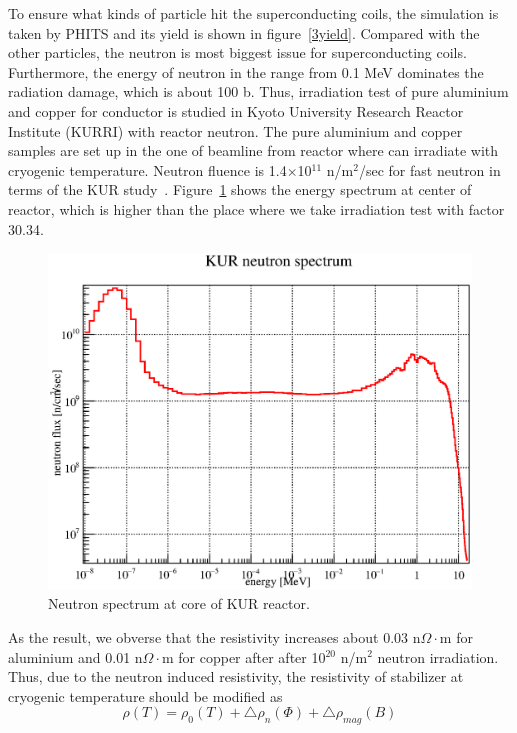 To ensure what kinds of particle hit the superconducting coils, the simulation is taken by PHITS and its yield is shown in figure~\ref{3yield}.
Compared with the other particles, the neutron is most biggest issue for superconducting coils.
Furthermore, the energy of neutron in the range from 0.1 MeV dominates the radiation damage, which is about 100 b.
Thus, irradiation test of pure aluminium and copper for conductor is studied in Kyoto University Research Reactor Institute (KURRI) with reactor neutron.
The pure aluminium and copper samples are set up in the one of beamline from reactor where can irradiate with cryogenic temperature.
Neutron fluence is 1.4$\times$10$^{11}$ n/m$^2$/sec for fast neutron in terms of the KUR study~\cite{kur}.
Figure~\ref{4dpa} shows the energy spectrum at center of reactor, which is higher than the place where we take irradiation test with factor 30.34.
  \begin{figure}[H]
    \centering
	\includegraphics[scale=0.43]{chapter5/fig/neutron.eps}
   \caption{Neutron spectrum at core of KUR reactor.}
   \label{4dpa}
  \end{figure}
As the result, we obverse that the resistivity increases about 0.03 n$\Omega\cdot$m for aluminium and 0.01 n$\Omega\cdot$m for copper after after 10$^{20}$ n/m$^2$ neutron irradiation.
Thus, due to the neutron induced resistivity, the resistivity of stabilizer at cryogenic temperature should be modified as
\begin{equation}
 \rho (T) = \rho_0(T) + \bigtriangleup \rho_{n} (\Phi) + \bigtriangleup \rho_{mag} (B)
\end{equation}
